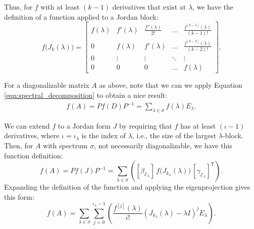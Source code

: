 \documentclass[12pt]{article}
\newcommand{\transpose}[1]{#1^{\mathsf{T}}}
\newcommand{\inverse}[1]{#1^{-1}}
\newcommand{\parens}[1]{ \left( #1 \right) }
\begin{document}
Thus, for $f$ with at least $(k - 1)$ derivatives that exist at $\lambda$, we
have the definition of a function applied to a Jordan block:
\begin{equation}\label{eq:f_jordan_block}
  f\big( J_k(\lambda) \big) =
  \begin{bmatrix}
    f(\lambda) & f'(\lambda) & \frac{f''(\lambda)}{2!} & \ldots & \frac{f^{[k - 1]}(\lambda)}{(k-1)!} \\
    0 & f(\lambda) & f'(\lambda) & \ldots & \frac{f^{[k - 2]}(\lambda)}{(k-2)!} \\
    0 & \vdots & \vdots & \ddots & \vdots \\
    0 & 0 & 0 & \ldots & f(\lambda)
  \end{bmatrix}.
\end{equation}

For a diagonalizable matrix $A$ as above, note that we can we apply Equation
\eqref{eqn:spectral_decomposition} to obtain a nice result:
\begin{align*}
  f(A) = Pf(D)\inverse{P} = \sum_{\lambda \in \sigma}{f(\lambda) E_\lambda}.
\end{align*}

We can extend $f$ to a Jordan form $J$ by requiring that $f$ has at least
$(\iota - 1)$ derivatives, where $\iota = \iota_\lambda$ is the index of
$\lambda$, i.e., the size of the largest $\lambda$-block. Then, for $A$ with
spectrum $\sigma$, not necessarily diagonalizable, we have this function
definition:
\begin{equation*}
  f(A) = P f(J) \inverse{P} = \sum_{\lambda \in \sigma}\parens{ [\beta_{\mathcal{E}_\lambda}]\, f\big( J_{k_\lambda}(\lambda) \big)\, \transpose{[\gamma_{\mathcal{E}_\lambda}]} }.
\end{equation*}
Expanding the definition of the function and applying the eigenprojection gives
this form:
\begin{equation}
  f(A) = \sum_{\lambda \in \sigma}\sum_{j=0}^{\iota_{\lambda} - 1}\parens{ \frac{f^{[j]}(\lambda)}{i!} (J_{k_\lambda}(\lambda) - \lambda I)^j E_{\lambda} }.
\end{equation}
\end{document}
